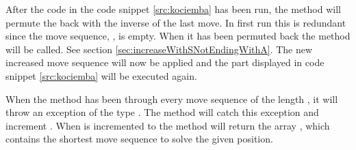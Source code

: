 After the code in the code snippet \ref{src:kociemba} has been run, the method will permute the \rubik{} back with the inverse of the last move. In first run this is redundant since the move sequence, , is empty. 
When it has been permuted back the method  will be called. 
See section \ref{sec:increaseWithSNotEndingWithA}. 
The new increased move sequence will now be applied and the part displayed in code snippet \ref{src:kociemba} will be executed again. 

When the method  has been through every move sequence of the length , it will throw an exception of the type  . 
The  method will catch this exception and increment . When  is incremented to  the method will return the array , which contains the shortest move sequence to solve the given \rubik{} position.  
\begin{comment}
Thereafter it tests if \vr{d + c.length} > \vr{l}. 
If that is true, \vr{l} will be set equal to the sum of \vr{d + c.length} and the \vr{result} array will be initialized with the size \vr{l}. 
In the \vr{result} array the move sequence \vr{b} and the move sequence \vr{c} is added and the console will print the current \vr{result} and the time it took in seconds.

After the method has tested if \vr{d + c.length < l} the method will permute the \rubik{} back with the inverse of the last move. When it has been permuted the method \vr{increaseWithSNotEndingWithA} will be called which increments the move sequence \vr{b}. See section \ref{sec:increaseWithSNotEndingWithA}.

When the method \vr{increaseWithSNotEndingWithA} throws an exception of the type \vr{UnableToIncreaseMoveSequenceException} the method increments \vr{d}. 
When \vr{d} is incremented to \vr{l} the method will return the \vr{result} array.
\end{comment}